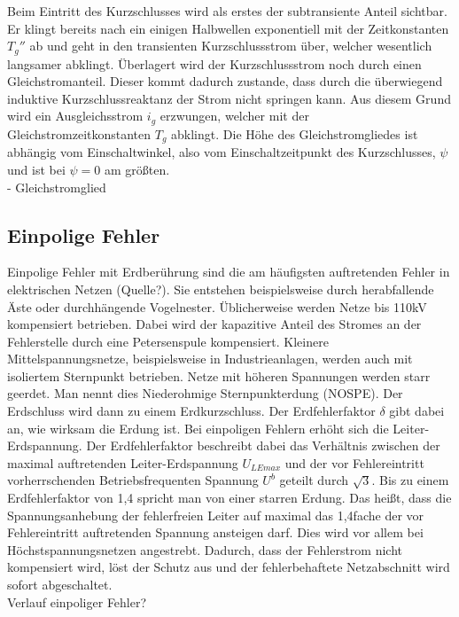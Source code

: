 \documentclass{scrartcl}
\begin{document}
\begin{onehalfspace}
Beim Eintritt des Kurzschlusses wird als erstes der subtransiente Anteil sichtbar. Er klingt bereits nach ein einigen Halbwellen exponentiell mit der Zeitkonstanten $T_g''$ ab und geht in den transienten Kurzschlussstrom über, welcher wesentlich langsamer abklingt. Überlagert wird der Kurzschlussstrom noch durch einen Gleichstromanteil. Dieser kommt dadurch zustande, dass durch die überwiegend induktive Kurzschlussreaktanz der Strom nicht \glqq springen\grqq{} kann. Aus diesem Grund wird ein Ausgleichsstrom $i_g$ erzwungen, welcher mit der Gleichstromzeitkonstanten $T_g$ abklingt. Die Höhe des Gleichstromgliedes ist abhängig vom Einschaltwinkel, also vom Einschaltzeitpunkt des Kurzschlusses, $\psi$ und ist bei $\psi = 0$ am größten.
\\- Gleichstromglied

\subsection{Einpolige Fehler}
Einpolige Fehler mit Erdberührung sind die am häufigsten auftretenden Fehler in elektrischen Netzen (Quelle?). Sie entstehen beispielsweise durch herabfallende Äste oder durchhängende Vogelnester. Üblicherweise werden Netze bis 110kV kompensiert betrieben. Dabei wird der kapazitive Anteil des Stromes an der Fehlerstelle durch eine Petersenspule kompensiert. Kleinere Mittelspannungsnetze, beispielsweise in Industrieanlagen, werden auch mit isoliertem Sternpunkt betrieben. Netze mit höheren Spannungen werden starr geerdet. Man nennt dies \glqq Niederohmige Sternpunkterdung\grqq{} (NOSPE). Der Erdschluss wird dann zu einem Erdkurzschluss. Der Erdfehlerfaktor $\delta$ gibt dabei an, wie wirksam die Erdung ist. Bei einpoligen Fehlern erhöht sich die Leiter-Erdspannung. Der Erdfehlerfaktor beschreibt dabei das Verhältnis zwischen der maximal auftretenden Leiter-Erdspannung $U_{LEmax}$ und der vor Fehlereintritt vorherrschenden Betriebsfrequenten Spannung $U^b$ geteilt durch $\sqrt{3}$. Bis zu einem Erdfehlerfaktor von 1,4 spricht man von einer \glqq starren Erdung\grqq{}. Das heißt, dass die Spannungsanhebung der fehlerfreien Leiter auf maximal das 1,4fache der vor Fehlereintritt auftretenden Spannung ansteigen darf. Dies wird vor allem bei Höchstspannungsnetzen angestrebt. Dadurch, dass der Fehlerstrom nicht kompensiert wird, löst der Schutz aus und der fehlerbehaftete Netzabschnitt wird sofort abgeschaltet.
\\ Verlauf einpoliger Fehler?


\end{onehalfspace}
\end{document}
